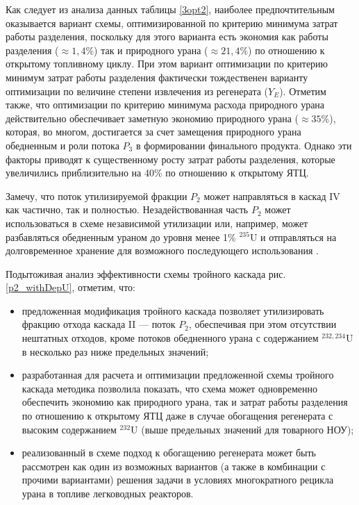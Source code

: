 Как следует из анализа данных таблицы \ref{3opt2}, наиболее предпочтительным оказывается вариант схемы, оптимизированной по критерию минимума затрат работы разделения, поскольку для этого варианта есть экономия как работы разделения ($\approx 1,4\%$) так и природного урана ($\approx 21,4\%$) по отношению к открытому топливному циклу. При этом вариант оптимизации по критерию минимум затрат работы разделения фактически тождественен варианту оптимизации по величине степени извлечения из регенерата ($Y_E$). Отметим также, что оптимизации по критерию минимума расхода природного урана действительно обеспечивает заметную экономию природного урана ($\approx 35\%$), которая, во многом, достигается за счет замещения природного урана обедненным и роли потока $P_3$ в формировании финального продукта. Однако эти факторы приводят к существенному росту затрат работы разделения, которые увеличились приблизительно на 40\% по отношению к открытому ЯТЦ.

Замечу, что поток утилизируемой фракции $P_2$ может направляться в каскад IV как частично, так и полностью. Незадействованная часть $P_2$ может использоваться в схеме независимой утилизации или, например, может разбавляться обедненным ураном до уровня менее 1\% $^{235}$U и отправляться на долговременное хранение для возможного последующего использования \cite{vodolazskihSposobIzotopnogoVosstanovleniya2006}.

Подытоживая анализ эффективности схемы тройного каскада рис. \ref{p2_withDepU}, отметим, что:

\begin{itemize}
    \item предложенная модификация тройного каскада позволяет утилизировать фракцию отхода каскада II --- поток $P_2$, обеспечивая при этом отсутствии нештатных отходов, кроме потоков обедненного урана с содержанием $^{232,234}$U в несколько раз ниже предельных значений; 
    \item разработанная для расчета и оптимизации предложенной схемы тройного каскада методика позволила показать, что схема может одновременно обеспечить экономию как природного урана, так и затрат работы разделения по отношению к открытому ЯТЦ даже в случае обогащения регенерата с высоким содержанием $^{232}$U (выше предельных значений для товарного НОУ); 
    \item реализованный в схеме подход к обогащению регенерата может быть рассмотрен как один из возможных вариантов (а также в комбинации с прочими вариантами) решения задачи в условиях многократного рецикла урана в топливе легководных реакторов.
\end{itemize}

